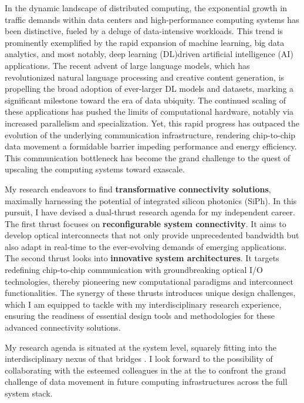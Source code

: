 In the dynamic landscape of distributed computing, the exponential growth in traffic demands within data centers and high-performance computing systems has been distinctive, fueled by a deluge of data-intensive workloads. This trend is prominently exemplified by the rapid expansion of machine learning, big data analytics, and most notably, deep learning (DL)\textendash driven artificial intelligence (AI) applications. The recent advent of large language models, which has revolutionized natural language processing and creative content generation, is propelling the broad adoption of ever-larger DL models and datasets, marking a significant milestone toward the era of data ubiquity. The continued scaling of these applications has pushed the limits of computational hardware, notably via increased parallelism and specialization. Yet, this rapid progress has outpaced the evolution of the underlying communication infrastructure, rendering chip-to-chip data movement a formidable barrier impeding performance and energy efficiency. This communication bottleneck has become the grand challenge to the quest of upscaling the computing systems toward exascale.

My research endeavors to find \textbf{transformative connectivity solutions}, maximally harnessing the potential of integrated silicon photonics (SiPh). In this pursuit, I have devised a dual-thrust research agenda for my independent career. The first thrust focuses on \textbf{reconfigurable system connectivity}. It aims to develop optical interconnects that not only provide unprecedented bandwidth but also adapt in real-time to the ever-evolving demands of emerging applications. The second thrust looks into \textbf{innovative system architectures}. It targets redefining chip-to-chip communication with groundbreaking optical I/O technologies, thereby pioneering new computational paradigms and interconnect functionalities. The synergy of these thrusts introduces unique design challenges, which I am equipped to tackle with my interdisciplinary research experience, ensuring the readiness of essential design tools and methodologies for these advanced connectivity solutions.

My research agenda is situated at the system level, squarely fitting into the interdisciplinary nexus of \appArea{} that bridges \appCollab{}. I look forward to the possibility of collaborating with the esteemed colleagues in the \appDept{} at the \appSchool{} to confront the grand challenge of data movement in future computing infrastructures across the full system stack.

